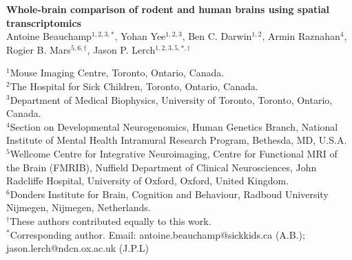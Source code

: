 
\LARGE{\textbf{Whole-brain comparison of rodent and human brains using spatial transcriptomics}}\\

\large
Antoine Beauchamp$^{1,2,3,*}$, Yohan Yee$^{1,2,3}$, Ben C. Darwin$^{1,2}$, Armin Raznahan$^{4}$, Rogier B. Mars$^{5,6,\dagger}$, Jason P. Lerch$^{1,2,3,5,*,\dagger}$\\

\onehalfspacing

\small
$^1$Mouse Imaging Centre, Toronto, Ontario, Canada.\\
$^2$The Hospital for Sick Children, Toronto, Ontario, Canada.\\
$^3$Department of Medical Biophysics, University of Toronto, Toronto, Ontario, Canada.\\
$^4$Section on Developmental Neurogenomics, Human Genetics Branch, National Institute of Mental Health Intramural Research Program, Bethesda, MD, U.S.A.\\
$^5$Wellcome Centre for Integrative Neuroimaging, Centre for Functional MRI of the Brain (FMRIB), Nuffield Department of Clinical Neurosciences, John Radcliffe Hospital, University of Oxford, Oxford, United Kingdom.\\
$^6$Donders Institute for Brain, Cognition and Behaviour, Radboud University Nijmegen, Nijmegen, Netherlands.\\
$^{\dagger}$These authors contributed equally to this work.\\
$^{*}$Corresponding author. Email: antoine.beauchamp@sickkids.ca (A.B.); jason.lerch@ndcn.ox.ac.uk (J.P.L)

\normalsize
{}